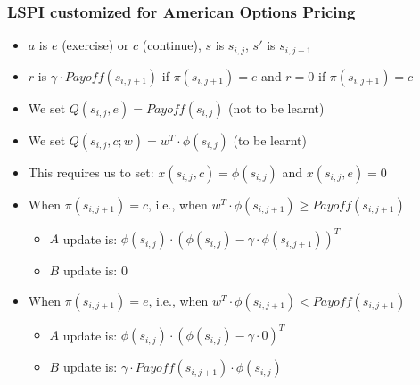 \documentclass[handout]{beamer}
\begin{document}
\begin{frame}
\frametitle{LSPI customized for American Options Pricing}
\pause
\begin{itemize}[<+->]
\item $a$ is $e$ (exercise) or $c$ (continue), $s$ is $s_{i,j}$, $s'$ is $s_{i,j+1}$
\item $r$ is $\gamma \cdot Payoff(s_{i,j+1})$ if $\pi(s_{i,j+1})=e$ and $r=0$ if $\pi(s_{i,j+1})=c$
\item We set $Q(s_{i,j},e) = Payoff(s_{i,j})$ (not to be learnt)
\item We set $Q(s_{i,j},c; w) = w^T \cdot \phi(s_{i,j})$ (to be learnt)
\item This requires us to set: $x(s_{i,j},c) = \phi(s_{i,j})$ and $x(s_{i,j},e) = 0$
\item When $\pi(s_{i,j+1}) = c$, i.e., when $w^T \cdot \phi(s_{i,j+1}) \geq Payoff(s_{i,j+1})$
\begin{itemize}
\item $A$ update is: $\phi(s_{i,j}) \cdot  (\phi(s_{i,j}) - \gamma \cdot \phi(s_{i,j+1}))^T$
\item $B$ update is: $0$
\end{itemize}
\item When $\pi(s_{i,j+1}) = e$, i.e., when $w^T \cdot \phi(s_{i,j+1}) < Payoff(s_{i,j+1})$
 \begin{itemize}
\item $A$ update is: $\phi(s_{i,j}) \cdot  (\phi(s_{i,j}) - \gamma \cdot 0)^T$
\item $B$ update is: $\gamma \cdot Payoff(s_{i,j+1}) \cdot \phi(s_{i,j})$
\end{itemize}
\end{itemize}
\end{frame}
\end{document}
